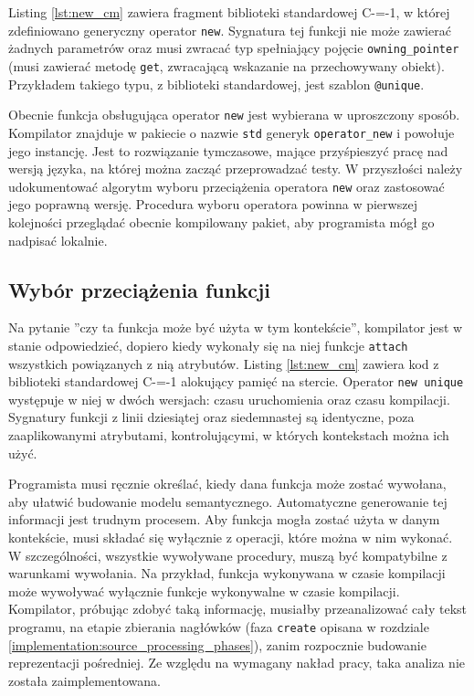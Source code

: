 Listing \ref{lst:new_cm} zawiera fragment biblioteki standardowej C-=-1, w której zdefiniowano generyczny operator \lstinline{new}.
Sygnatura tej funkcji nie może zawierać żadnych parametrów oraz musi zwracać typ spełniający pojęcie \lstinline{owning_pointer} (musi zawierać metodę \lstinline{get}, zwracającą wskazanie na przechowywany obiekt).
Przykładem takiego typu, z biblioteki standardowej, jest szablon \lstinline{@unique}.

Obecnie funkcja obsługująca operator \lstinline{new} jest wybierana w uproszczony sposób.
Kompilator znajduje w pakiecie o nazwie \lstinline{std} generyk \lstinline{operator_new} i powołuje jego instancję.
Jest to rozwiązanie tymczasowe, mające przyśpieszyć pracę nad wersją języka, na której można zacząć przeprowadzać testy.
W przyszłości należy udokumentować algorytm wyboru przeciążenia operatora \lstinline{new} oraz zastosować jego poprawną wersję.
Procedura wyboru operatora powinna w pierwszej kolejności przeglądać obecnie kompilowany pakiet, aby programista mógł go nadpisać lokalnie.

\subsection{Wybór przeciążenia funkcji}
\label{Function_overload_resolution}

Na pytanie ''czy ta funkcja może być użyta w tym kontekście'', kompilator jest w stanie odpowiedzieć, dopiero kiedy wykonały się na niej funkcje \lstinline{attach} wszystkich powiązanych z nią atrybutów.
Listing \ref{lst:new_cm} zawiera kod z biblioteki standardowej C-=-1 alokujący pamięć na stercie.
Operator \lstinline{new unique} występuje w niej w dwóch wersjach: czasu uruchomienia oraz czasu kompilacji.
Sygnatury funkcji z linii dziesiątej oraz siedemnastej są identyczne, poza zaaplikowanymi atrybutami, kontrolującymi, w których kontekstach można ich użyć.

Programista musi ręcznie określać, kiedy dana funkcja może zostać wywołana, aby ułatwić budowanie modelu semantycznego.
Automatyczne generowanie tej informacji jest trudnym procesem.
Aby funkcja mogła zostać użyta w danym kontekście, musi składać się wyłącznie z operacji, które można w nim wykonać.
W szczególności, wszystkie  wywoływane procedury, muszą być kompatybilne z warunkami wywołania.
Na przykład, funkcja wykonywana w czasie kompilacji może wywoływać wyłącznie funkcje wykonywalne w czasie kompilacji.
Kompilator, próbując zdobyć taką informację, musiałby przeanalizować cały tekst programu, na etapie zbierania nagłówków (faza \lstinline{create} opisana w rozdziale \ref{implementation:source_processing_phases}), zanim rozpocznie budowanie reprezentacji pośredniej.
Ze względu na wymagany nakład pracy, taka analiza nie została zaimplementowana.

